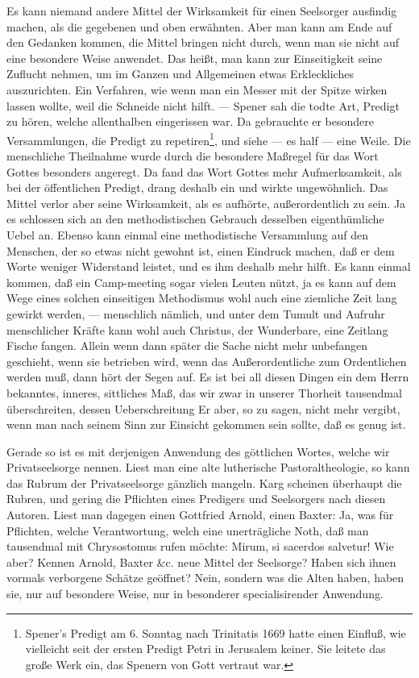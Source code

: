 Es kann niemand andere Mittel der Wirksamkeit für einen Seelsorger ausfindig machen, als die gegebenen und oben erwähnten. Aber man kann am Ende auf den Gedanken kommen, die Mittel bringen nicht durch, wenn man sie nicht auf eine besondere Weise anwendet. Das heißt, man kann zur Einseitigkeit seine Zuflucht nehmen, um im Ganzen und Allgemeinen etwas Erkleckliches auszurichten. Ein Verfahren, wie wenn man ein Messer mit der Spitze wirken lassen wollte, weil die Schneide nicht hilft. — Spener sah die todte Art, Predigt zu hören, welche allenthalben eingerissen war. Da gebrauchte er besondere Versammlungen, die Predigt zu repetiren\footnote{Spener’s Predigt am 6. Sonntag nach Trinitatis 1669 hatte einen Einfluß, wie vielleicht seit der ersten Predigt Petri in Jerusalem keiner. Sie leitete das große Werk ein, das Spenern von Gott vertraut war.}, und siehe — es half — eine Weile. Die menschliche Theilnahme wurde durch die besondere Maßregel für das Wort Gottes besonders angeregt. Da fand das Wort Gottes mehr Aufmerksamkeit, als bei der öffentlichen Predigt, drang deshalb ein und wirkte ungewöhnlich. Das Mittel verlor aber seine Wirksamkeit, als es aufhörte, außerordentlich zu sein. Ja es schlossen sich an den methodistischen Gebrauch desselben eigenthümliche Uebel an. Ebenso kann einmal eine methodistische Versammlung auf den Menschen, der so etwas nicht gewohnt ist, einen Eindruck machen, daß er dem Worte weniger Widerstand leistet, und es ihm
deshalb mehr hilft. Es kann einmal kommen, daß ein Camp-meeting sogar vielen Leuten nützt, ja es kann auf dem Wege eines solchen einseitigen Methodismus wohl auch eine ziemliche Zeit lang gewirkt werden, — menschlich nämlich, und unter dem Tumult und Aufruhr menschlicher Kräfte kann wohl auch Christus, der Wunderbare, eine Zeitlang Fische fangen. Allein wenn dann später die Sache nicht mehr unbefangen geschieht, wenn sie betrieben wird, wenn das Außerordentliche zum Ordentlichen werden muß, dann hört der Segen auf. Es ist bei all diesen Dingen ein dem Herrn bekanntes, inneres, sittliches Maß, das wir zwar in unserer Thorheit tausendmal überschreiten, dessen Ueberschreitung Er aber, so zu sagen, nicht mehr vergibt, wenn man nach seinem Sinn zur Einsicht gekommen sein sollte, daß es genug ist.

Gerade so ist es mit derjenigen Anwendung des göttlichen Wortes, welche wir Privatseelsorge nennen. Liest man eine alte lutherische Pastoraltheologie, so kann das Rubrum der Privatseelsorge gänzlich mangeln. Karg scheinen überhaupt die Rubren, und gering die Pflichten eines Predigers und Seelsorgers nach diesen Autoren. Liest man dagegen einen Gottfried Arnold, einen Baxter: Ja, was für Pflichten, welche Verantwortung, welch eine unerträgliche Noth, daß man tausendmal mit Chrysostomus rufen möchte: Mirum, si sacerdos salvetur! Wie aber? Kennen Arnold, Baxter \&c. neue Mittel der Seelsorge? Haben sich ihnen vormals verborgene Schätze geöffnet? Nein, sondern was die Alten haben, haben sie, nur auf besondere Weise, nur in besonderer specialisirender Anwendung.

